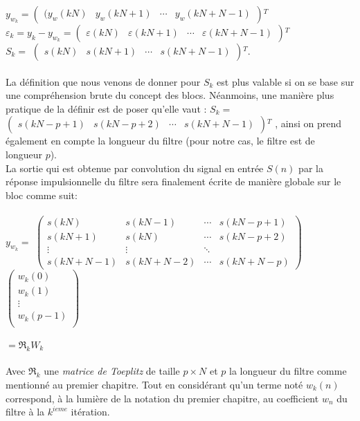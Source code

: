 $ y_{w_{k}} = $\(\begin{pmatrix}
(y_{w}(kN) & y_{w}(kN+1) & \cdots & y_{w}(kN+N-1)
\end{pmatrix}\)$^{T} $\\
$ \varepsilon_{k} = y_{k} - y_{w_{k}} = $\(\begin{pmatrix}
\varepsilon(kN) & \varepsilon(kN+1) & \cdots & \varepsilon(kN+N-1)
\end{pmatrix}\)$^{T} $\\
$ S_{k} = $ \(\begin{pmatrix}
s(kN) & s(kN+1) & \cdots & s(kN+N-1)
\end{pmatrix}\)$^{T} $.\\
 \\
La définition que nous venons de donner pour $ S_{k} $ est plus valable si on se base sur une compréhension brute du concept des blocs. Néanmoins, une manière plus pratique de la définir est de poser qu'elle vaut : $ S_{k} = $\(\begin{pmatrix}
s(kN-p+1) & s(kN-p+2) & \cdots & s(kN+N-1)
\end{pmatrix}\)$ ^{T} $ , ainsi on prend également en compte la longueur du filtre (pour notre cas, le filtre est de longueur $ p $).\\
La sortie qui est obtenue par convolution du signal en entrée $ S(n) $ par la réponse impulsionnelle du filtre sera finalement écrite de manière globale sur le bloc comme suit:\\
 \\
$ y_{w_{k}} = $ $  $\(\begin{pmatrix}
s(kN) & s(kN-1) & \cdots & s(kN-p+1)\\
s(kN+1) & s(kN) & \cdots & s(kN-p+2)\\
\vdots & \vdots & \ddots\\
s(kN+N-1) & s(kN+N-2) & \cdots & s(kN+N-p)
\end{pmatrix}\)\(\begin{pmatrix}
w_{k}(0)\\
w_{k}(1)\\
\vdots\\
w_{k}(p-1)\\
\end{pmatrix}\)
\\
 \\
       $ = \mathfrak{R}_{k}W_{k} $\\
       \\
Avec $ \mathfrak{R}_{k} $ une \emph{matrice de Toeplitz} de taille $ p\times N $ et $ p $ la longueur du filtre comme mentionné au premier chapitre. Tout en considérant qu'un terme noté $ w_{k}(n) $ correspond, à la lumière de la notation du premier chapitre, au coefficient $ w_{n} $ du filtre à la $ k^{ieme} $ itération.
